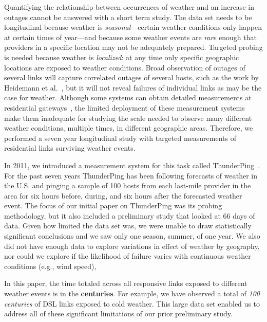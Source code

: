 
Quantifying the relationship between occurrences of weather and an increase in
outages cannot be answered with a short term %
study.
%
The data set needs to be longitudinal because weather is
\emph{seasonal}---certain weather conditions only happen at certain times of
year---and because some weather events are \emph{rare} enough that providers in a 
specific location may not be adequately prepared.
%
Targeted probing is needed because weather is \emph{localized}: at any time
only specific geographic locations are exposed to weather conditions.
%
Broad observation of outages of several links will capture correlated outages
of several hosts, such as the work by Heidemann et al.~\cite{imc08-heidemann,
trinocular}, but it will not reveal failures of individual links as may be
the case for weather.
%
Although some systems can obtain detailed measurements at residential
gateways~\cite{ripe-atlas,sundaresan-sigcomm11}, the limited deployment of
these measurement systems make them inadequate for studying the scale needed to
observe many different weather conditions, multiple times, in different
geographic areas.
%
Therefore, we performed a seven year longitudinal study with targeted
measurements of residential links surviving weather events.

In 2011, we introduced a measurement system for this task called
ThunderPing~\cite{schulman-imc11}.
%
For the past seven years ThunderPing has been following forecasts of weather in
the U.S. and pinging a sample of 100 hosts from each last-mile provider in the
area for six hours before, during, and six hours after the forecasted weather
event.
%
The focus of our initial paper on ThunderPing was its probing methodology, but
it also included a preliminary study that looked at 66 days of data.
%
Given how limited the data set was, we were unable to draw statistically 
significant conclusions and we saw only one season, summer, of one
year. %
%
We also did not have enough data to explore variations in effect of
weather by geography,
%
nor could we explore if the likelihood of failure varies
with continuous weather conditions (e.g., wind speed),
 
In this paper, the time totaled across all responsive links
exposed to different weather events is in the \textbf{centuries}.
%
For example,
we have observed a total of \emph{100 centuries} of DSL links exposed to cold
weather.
%
This large data set enabled us to address all of these significant limitations
of our prior preliminary study.
 
